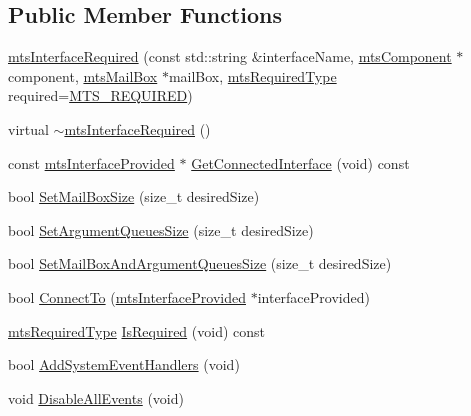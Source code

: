 \subsection*{Public Member Functions}
\begin{DoxyCompactItemize}
\item 
\hyperlink{classmts_interface_required_a63ce5c4fbbfae3627f118818707b8712}{mts\+Interface\+Required} (const std\+::string \&interface\+Name, \hyperlink{classmts_component}{mts\+Component} $\ast$component, \hyperlink{classmts_mail_box}{mts\+Mail\+Box} $\ast$mail\+Box, \hyperlink{mts_forward_declarations_8h_a9ef1ce54724afde7802db326ff8606f3}{mts\+Required\+Type} required=\hyperlink{mts_forward_declarations_8h_a9ef1ce54724afde7802db326ff8606f3ae01fd85391b60e546bbb1be9716c4ec9}{M\+T\+S\+\_\+\+R\+E\+Q\+U\+I\+R\+E\+D})
\item 
virtual \hyperlink{classmts_interface_required_ac44703c9161331b2b816ffbecac1e661}{$\sim$mts\+Interface\+Required} ()
\item 
const \hyperlink{classmts_interface_provided}{mts\+Interface\+Provided} $\ast$ \hyperlink{classmts_interface_required_a461c0fbbf35afcb27fb849abd1e0b093}{Get\+Connected\+Interface} (void) const 
\item 
bool \hyperlink{classmts_interface_required_ab87c1f6386cd1e27457af53a8f01d95e}{Set\+Mail\+Box\+Size} (size\+\_\+t desired\+Size)
\item 
bool \hyperlink{classmts_interface_required_a1f1d352367c25bdad40115a39638f12e}{Set\+Argument\+Queues\+Size} (size\+\_\+t desired\+Size)
\item 
bool \hyperlink{classmts_interface_required_a4c67d774d33c69ee2777549f9192d89b}{Set\+Mail\+Box\+And\+Argument\+Queues\+Size} (size\+\_\+t desired\+Size)
\item 
bool \hyperlink{classmts_interface_required_aa92fb5c95ad7f9fd4100cec0105e3381}{Connect\+To} (\hyperlink{classmts_interface_provided}{mts\+Interface\+Provided} $\ast$interface\+Provided)
\item 
\hyperlink{mts_forward_declarations_8h_a9ef1ce54724afde7802db326ff8606f3}{mts\+Required\+Type} \hyperlink{classmts_interface_required_ab9532cdc6e9e1674f69e9072a7c38ae2}{Is\+Required} (void) const 
\item 
bool \hyperlink{classmts_interface_required_a8830a8a10b35d4a57396edbb4e328012}{Add\+System\+Event\+Handlers} (void)
\item 
void \hyperlink{classmts_interface_required_a76076bd77bae78e5c9dec3b392dd3448}{Disable\+All\+Events} (void)
\item 

\end{DoxyCompactItemize}
